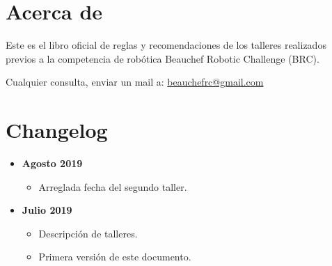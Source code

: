 \section*{Acerca de}
Este es el libro oficial de reglas y recomendaciones de los talleres realizados previos a la competencia de robótica Beauchef Robotic Challenge (BRC).

Cualquier consulta, enviar un mail a: \href{mailto:beauchefrc@gmail.com}{beauchefrc@gmail.com}






\section*{Changelog}

\begin{itemize}
  \item \textbf{Agosto 2019}
  \begin{itemize}
    \item Arreglada fecha del segundo taller.
  \end{itemize}
  \item \textbf{Julio 2019}
  \begin{itemize}
    \item Descripción de talleres.
    \item Primera versión de este documento.
  \end{itemize}
\end{itemize}

